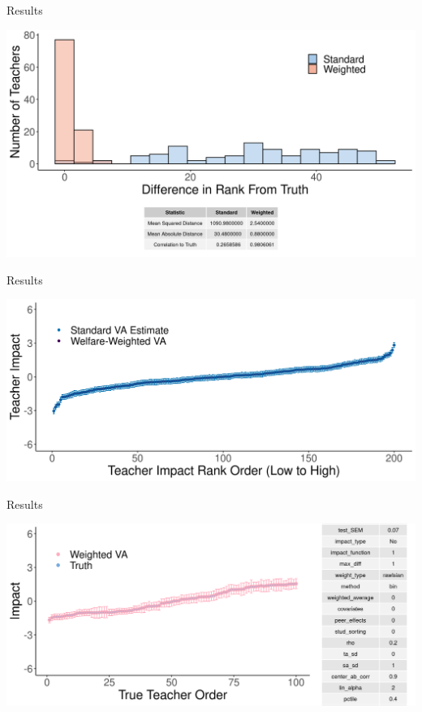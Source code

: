 \documentclass[11pt]{beamer}
\begin{document}
\begin{frame}{Results}

\includegraphics[width=\linewidth]{slides/Figures/hist_run_1.png}

\end{frame}



\begin{frame}{Results}

\includegraphics[width=\linewidth]{slides/Figures/standard_cat_run_1.png}

\end{frame}



\begin{frame}{Results}

\includegraphics[width=\linewidth]{slides/Figures/ww_cat_run_1.png}

\end{frame}
\end{document}
